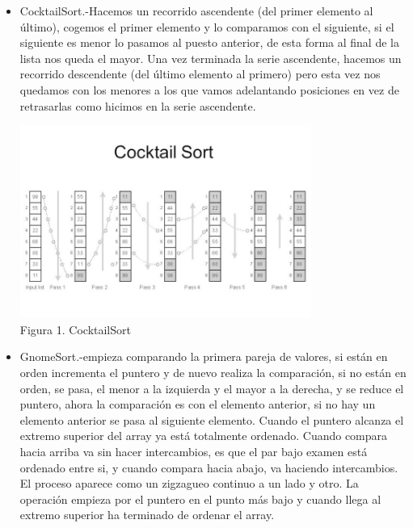 \documentclass[spanish]{article}
\begin{document}
	\begin{itemize}
		\item CocktailSort.-Hacemos un recorrido ascendente (del primer elemento al último), cogemos el primer elemento y lo comparamos con el siguiente, si el siguiente es menor lo pasamos al puesto anterior, de esta forma al final de la lista nos queda el mayor. Una vez terminada la serie ascendente, hacemos un recorrido descendente (del último elemento al primero) pero esta vez nos quedamos con los menores a los que vamos adelantando posiciones en vez de retrasarlas como hicimos en la serie ascendente.
	\begin{center}
		\includegraphics[width=0.75\textwidth]{./imagenes/cocktailsort.png}\\
		Figura 1. CocktailSort\\
	\end{center}
\newpage
		\item GnomeSort.-empieza comparando la primera pareja de valores, si están en orden incrementa el puntero y de nuevo realiza la comparación, si no están en orden, se pasa, el menor a la izquierda y el mayor a la derecha, y se reduce el puntero, ahora la comparación es con el elemento anterior, si no hay un elemento anterior se pasa al siguiente elemento. Cuando el puntero alcanza el extremo superior del array ya está totalmente ordenado.
Cuando compara hacia arriba va sin hacer intercambios, es que el par bajo examen está ordenado entre si, y cuando compara hacia abajo, va haciendo intercambios. El proceso aparece como un zigzagueo continuo a un lado y otro.
La operación empieza por el puntero en el punto más bajo y cuando llega al extremo superior ha terminado de ordenar el array.
		\begin{center}

\end{center}
\end{itemize}
\end{document}
